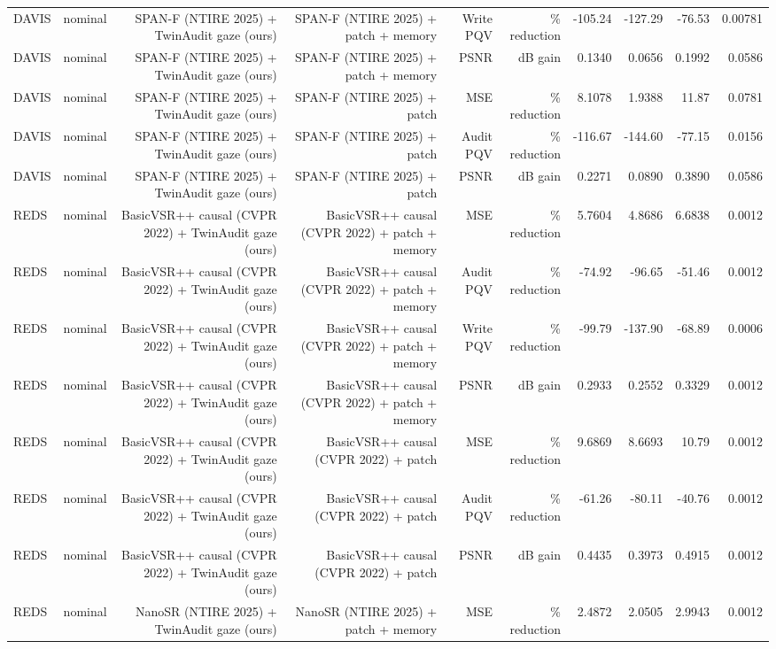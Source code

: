 \begin{table}[t]
\begin{tabular}{llrrrrrrrr}
DAVIS & nominal & SPAN-F (NTIRE 2025) + TwinAudit gaze (ours) & SPAN-F (NTIRE 2025) + patch + memory & Write PQV & \% reduction & -105.24 & -127.29 & -76.53 & 0.00781 \\
DAVIS & nominal & SPAN-F (NTIRE 2025) + TwinAudit gaze (ours) & SPAN-F (NTIRE 2025) + patch + memory & PSNR & dB gain & 0.1340 & 0.0656 & 0.1992 & 0.0586 \\
DAVIS & nominal & SPAN-F (NTIRE 2025) + TwinAudit gaze (ours) & SPAN-F (NTIRE 2025) + patch & MSE & \% reduction & 8.1078 & 1.9388 & 11.87 & 0.0781 \\
DAVIS & nominal & SPAN-F (NTIRE 2025) + TwinAudit gaze (ours) & SPAN-F (NTIRE 2025) + patch & Audit PQV & \% reduction & -116.67 & -144.60 & -77.15 & 0.0156 \\
DAVIS & nominal & SPAN-F (NTIRE 2025) + TwinAudit gaze (ours) & SPAN-F (NTIRE 2025) + patch & PSNR & dB gain & 0.2271 & 0.0890 & 0.3890 & 0.0586 \\
REDS & nominal & BasicVSR++ causal (CVPR 2022) + TwinAudit gaze (ours) & BasicVSR++ causal (CVPR 2022) + patch + memory & MSE & \% reduction & 5.7604 & 4.8686 & 6.6838 & 0.0012 \\
REDS & nominal & BasicVSR++ causal (CVPR 2022) + TwinAudit gaze (ours) & BasicVSR++ causal (CVPR 2022) + patch + memory & Audit PQV & \% reduction & -74.92 & -96.65 & -51.46 & 0.0012 \\
REDS & nominal & BasicVSR++ causal (CVPR 2022) + TwinAudit gaze (ours) & BasicVSR++ causal (CVPR 2022) + patch + memory & Write PQV & \% reduction & -99.79 & -137.90 & -68.89 & 0.0006 \\
REDS & nominal & BasicVSR++ causal (CVPR 2022) + TwinAudit gaze (ours) & BasicVSR++ causal (CVPR 2022) + patch + memory & PSNR & dB gain & 0.2933 & 0.2552 & 0.3329 & 0.0012 \\
REDS & nominal & BasicVSR++ causal (CVPR 2022) + TwinAudit gaze (ours) & BasicVSR++ causal (CVPR 2022) + patch & MSE & \% reduction & 9.6869 & 8.6693 & 10.79 & 0.0012 \\
REDS & nominal & BasicVSR++ causal (CVPR 2022) + TwinAudit gaze (ours) & BasicVSR++ causal (CVPR 2022) + patch & Audit PQV & \% reduction & -61.26 & -80.11 & -40.76 & 0.0012 \\
REDS & nominal & BasicVSR++ causal (CVPR 2022) + TwinAudit gaze (ours) & BasicVSR++ causal (CVPR 2022) + patch & PSNR & dB gain & 0.4435 & 0.3973 & 0.4915 & 0.0012 \\
REDS & nominal & NanoSR (NTIRE 2025) + TwinAudit gaze (ours) & NanoSR (NTIRE 2025) + patch + memory & MSE & \% reduction & 2.4872 & 2.0505 & 2.9943 & 0.0012 \\

\end{tabular}
\end{table}
